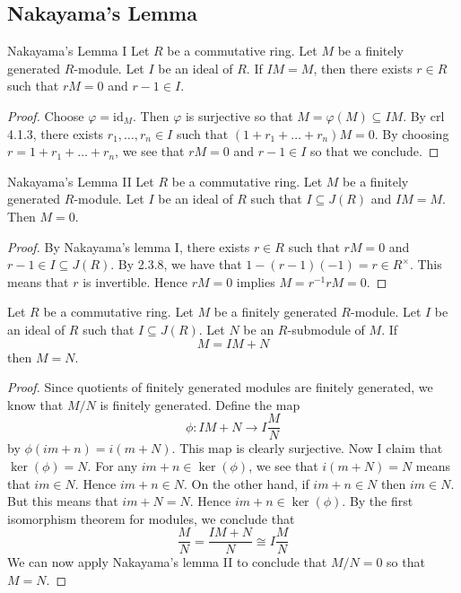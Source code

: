 \documentclass[a4paper]{article}
\begin{document}
\subsection{Nakayama's Lemma}
\begin{lmm}{Nakayama's Lemma I}{} Let $R$ be a commutative ring. Let $M$ be a finitely generated $R$-module. Let $I$ be an ideal of $R$. If $IM=M$, then there exists $r\in R$ such that $rM=0$ and $r-1\in I$. 
\begin{proof}
Choose $\varphi=\text{id}_M$. Then $\varphi$ is surjective so that $M=\varphi(M)\subseteq IM$. By crl 4.1.3, there exists $r_1,\dots,r_n\in I$ such that $(1+r_1+\dots+r_n)M=0$. By choosing $r=1+r_1+\dots+r_n$, we see that $rM=0$ and $r-1\in I$ so that we conclude. 
\end{proof}
\end{lmm}

\begin{lmm}{Nakayama's Lemma II}{} Let $R$ be a commutative ring. Let $M$ be a finitely generated $R$-module. Let $I$ be an ideal of $R$ such that $I\subseteq J(R)$ and $IM=M$. Then $M=0$. 
\begin{proof}
By Nakayama's lemma I, there exists $r\in R$ such that $rM=0$ and $r-1\in I\subseteq J(R)$. By 2.3.8, we have that $1-(r-1)(-1)=r\in R^\times$. This means that $r$ is invertible. Hence $rM=0$ implies $M=r^{-1}rM=0$. 
\end{proof}
\end{lmm}

\begin{crl}{}{} Let $R$ be a commutative ring. Let $M$ be a finitely generated $R$-module. Let $I$ be an ideal of $R$ such that $I\subseteq J(R)$. Let $N$ be an $R$-submodule of $M$. If $$M=IM+N$$ then $M=N$. 
\begin{proof}
Since quotients of finitely generated modules are finitely generated, we know that $M/N$ is finitely generated. Define the map $$\phi:IM+N\to I\frac{M}{N}$$ by $\phi(im+n)=i(m+N)$. This map is clearly surjective. Now I claim that $\ker(\phi)=N$. For any $im+n\in\ker(\phi)$, we see that $i(m+N)=N$ means that $im\in N$. Hence $im+n\in N$. On the other hand, if $im+n\in N$ then $im\in N$. But this means that $im+N=N$. Hence $im+n\in\ker(\phi)$. By the first isomorphism theorem for modules, we conclude that $$\frac{M}{N}=\frac{IM+N}{N}\cong I\frac{M}{N}$$ We can now apply Nakayama's lemma II to conclude that $M/N=0$ so that $M=N$. 
\end{proof}
\end{crl}
\end{document}
